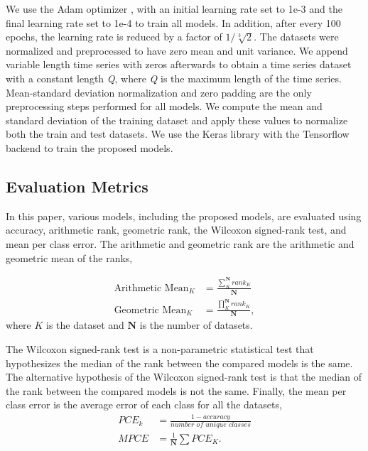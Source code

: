 \documentclass[preprint,12pt,3p]{elsarticle}
\begin{document}
We use the Adam optimizer \cite{kingma2014adam}, with an initial learning rate set to 1e-3 and the final learning rate set to 1e-4 to train all models. In addition, after every 100 epochs, the learning rate is reduced by a factor of $1/{\sqrt[3]{2}}$. The datasets were normalized and preprocessed to have zero mean and unit variance. We append variable length time series with zeros afterwards to obtain a time series dataset with a constant length \textit{Q}, where \textit{Q} is the maximum length of the time series. Mean-standard deviation normalization and zero padding are the only preprocessing steps performed for all models. We compute the mean and standard deviation of the training dataset and apply these values to normalize both the train and test datasets. We use the Keras \cite{chollet2015keras} library with the Tensorflow backend \cite{tensorflow2015-whitepaper} to train the proposed models. 

 
\subsection{Evaluation Metrics}





In this paper, various models, including the proposed models, are evaluated using accuracy, arithmetic rank, geometric rank, the Wilcoxon signed-rank test, and mean per class error. The arithmetic and geometric rank are the arithmetic and geometric mean of the ranks,

\begin{align*}
\text{Arithmetic Mean}_{K} &= \frac{\sum_{K}^{\textbf{N}} \textit{rank}_{K}}{\textbf{N}} \\
\text{Geometric Mean}_{K} &= \frac{\prod_{K}^{\textbf{N}} \textit{rank}_K}{\textbf{N}},
\end{align*}
where $K$ is the dataset and $\textbf{N}$ is the number of datasets. 

The Wilcoxon signed-rank test is a non-parametric statistical test that hypothesizes the median of the rank between the compared models is the same. The alternative hypothesis of the Wilcoxon signed-rank test is that the median of the rank between the compared models is not the same. Finally, the mean per class error is the average error of each class for all the datasets,
\begin{align*}
PCE_k &=\frac{1-accuracy}{\textit{number of unique classes}} \\
MPCE &=\frac{1}{{\textbf{N}}} \sum{PCE_K}.
\end{align*}
 
\end{document}
